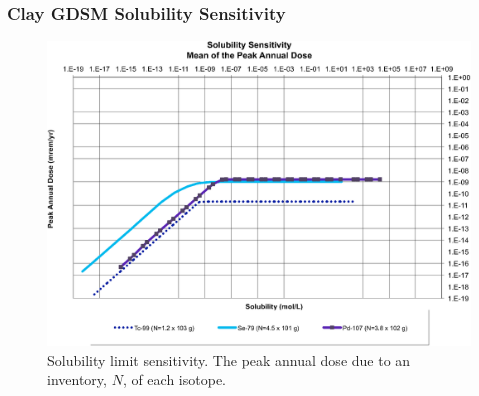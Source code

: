 \begin{frame}[ctb!]
\frametitle{Clay GDSM Solubility Sensitivity}
\begin{figure}[htb!]
\centering
\includegraphics[width=0.7\linewidth]{./nuclide_demonstration/Solubility_Summary_Sol.eps}
\caption{Solubility limit sensitivity. The peak annual dose due to an inventory, 
$N$, of each isotope.}
\label{fig:SolSum}
\end{figure}
\end{frame}
